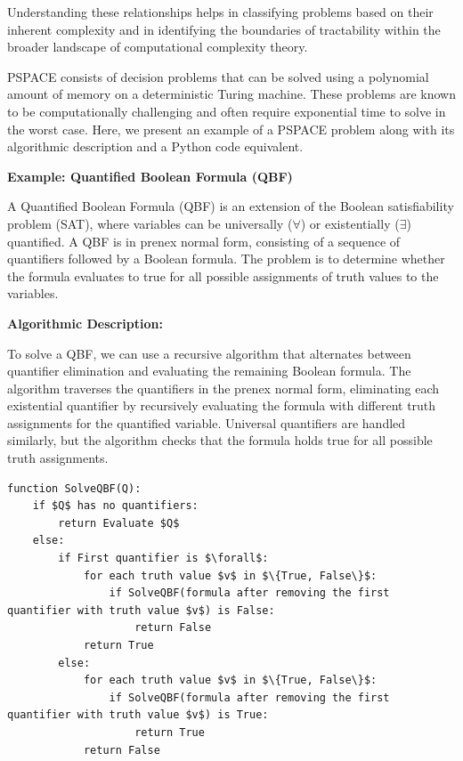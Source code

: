 \documentclass[12pt]{book} %
\begin{document}
Understanding these relationships helps in classifying problems based on their inherent complexity and in identifying the boundaries of tractability within the broader landscape of computational complexity theory.


PSPACE consists of decision problems that can be solved using a polynomial amount of memory on a deterministic Turing machine. These problems are known to be computationally challenging and often require exponential time to solve in the worst case. Here, we present an example of a PSPACE problem along with its algorithmic description and a Python code equivalent.

\textbf{Example: Quantified Boolean Formula (QBF)}

A Quantified Boolean Formula (QBF) is an extension of the Boolean satisfiability problem (SAT), where variables can be universally (\(\forall\)) or existentially (\(\exists\)) quantified. A QBF is in prenex normal form, consisting of a sequence of quantifiers followed by a Boolean formula. The problem is to determine whether the formula evaluates to true for all possible assignments of truth values to the variables.

\textbf{Algorithmic Description:}

To solve a QBF, we can use a recursive algorithm that alternates between quantifier elimination and evaluating the remaining Boolean formula. The algorithm traverses the quantifiers in the prenex normal form, eliminating each existential quantifier by recursively evaluating the formula with different truth assignments for the quantified variable. Universal quantifiers are handled similarly, but the algorithm checks that the formula holds true for all possible truth assignments.

\begin{lstlisting}[caption={SolveQBF algorithm},label={lst:solve_qbf}]
function SolveQBF(Q):
    if $Q$ has no quantifiers:
        return Evaluate $Q$
    else:
        if First quantifier is $\forall$:
            for each truth value $v$ in $\{True, False\}$:
                if SolveQBF(formula after removing the first quantifier with truth value $v$) is False:
                    return False
            return True
        else:
            for each truth value $v$ in $\{True, False\}$:
                if SolveQBF(formula after removing the first quantifier with truth value $v$) is True:
                    return True
            return False
\end{lstlisting}
\end{document}
